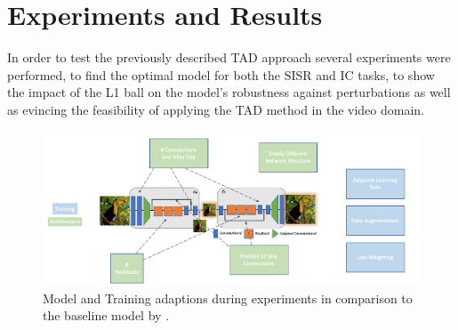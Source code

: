 \newpage
\section{Experiments and Results}
\label{sec:ExperimentsandResults}
In order to test the previously described \ac{TAD} approach several experiments
were performed, to find the optimal model for both the \ac{SISR} and \ac{IC}
tasks, to show the impact of the L1 ball on the model's robustness against
perturbations as well as evincing the feasibility of applying the \ac{TAD}
method in the video domain.

\begin{figure}[!htbp]
	\centering
	\includegraphics[width=14cm]{figures/model_adaptions}
	\caption{Model and Training adaptions during experiments in comparison
  to the baseline model by \cite{TAID}.}
  \label{fig:model_adaptions}
\end{figure}

